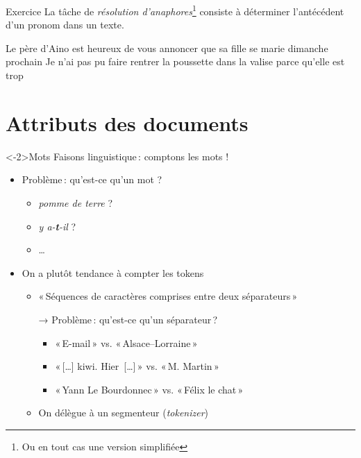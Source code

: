 \documentclass[../allslides.tex]{subfiles}
\begin{document}
\renewcommand\docdate{2021-02-18}  %



\begin{frame}{Exercice}
	La tâche de \emph{résolution d'anaphores}\footnote{Ou en tout cas une version simplifiée} consiste à déterminer l'antécédent d'un pronom dans un texte.
	\vspace{\bigskipamount}

	\begin{overprint}
		 \alert<3>{Le père d'Aino} est heureux de vous annoncer que \alert{sa} fille se marie dimanche prochain
		\onslide<4-> Je n'ai pas pu faire rentrer \alert<5>{la poussette} dans \alert<6->{la valise} parce qu'\alert{elle} est trop \alt<4-5>{grande}{\textbf<6>{petite}}
	\end{overprint}

\end{frame}

\section{Attributs des documents}

\begin{frame}<-2>{Mots}
	Faisons  linguistique : comptons les \alert{mots} !
	\begin{itemize}
		\item Problème : qu'est-ce qu'un mot ?
			\begin{itemize}
				\item \emph{pomme de terre} ?
				\item \emph{y a-\textbf{t}-il} ?
				\item …
			\end{itemize}
		\item On a plutôt tendance à compter les \alert{tokens}
			\begin{itemize}
				\item « Séquences de caractères comprises entre deux séparateurs »
				\item[→] Problème : qu'est-ce qu'un séparateur ? \begin{itemize}
					\item « E-mail » vs. « Alsace–Lorraine »
					\item « […] kiwi. Hier […] » vs. « M. Martin »
					\item « Yann Le Bourdonnec » vs. « Félix le chat »
				\end{itemize}
				\item On délègue à un segmenteur (\emph{tokenizer})
			\end{itemize}
	\end{itemize}
\end{frame}
\end{document}
